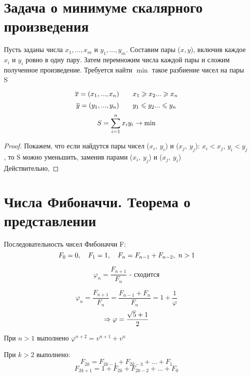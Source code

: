 \documentclass[12pt, fleqn]{article}
\begin{document}
\section{Задача о минимуме скалярного произведения}
Пусть заданы числа $x_1,...,x_m$ и $y_1,...,y_m$. Составим пары ($x,y$), включив каждое $x_i$ и $y_i$ ровно в одну пару. Затем перемножим числа каждой пары и сложим полученное произведение. Требуется найти $\min$ такое разбиение чисел на пары S
\begin{Theorem}
  \[\overline{x} = (x_1,...,x_n) \qquad x_1 \geqslant x_2 ... \geqslant x_n\]
  \[\overline{y} = (y_1,...,y_n) \qquad y_1 \leqslant y_2 ... \leqslant y_n\]
  \[S = \sum_{i=1}^n x_i y_i \rightarrow \min\]
\end{Theorem}

\begin{proof}
  Покажем, что если найдутся пары чисел ($x_i,\ y_i$) и ($x_j,\ y_j$): $x_i < x_j$, $y_i < y_j$, то S можно уменьшить, заменив парами ($x_i,\ y_j$) и ($x_j,\ y_i$)\\
  Действительно,
\end{proof}

\section{Числа Фибоначчи. Теорема о представлении}
\begin{definition}
  Последовательность чисел Фибоначчи F:
  \[F_0 = 0,\q F_1=1,\q F_n = F_{n-1} + F_{n-2},\ n>1\]
\end{definition}

\begin{Utv}
  \[\varphi_n = \dfrac{F_{n+1}}{F_n} \text{ - сходится}\]
\end{Utv}

\begin{Consequence}
  \[\varphi_n = \dfrac{F_{n+1}}{F_n} = \dfrac{F_{n-1} + F_n}{F_n} = 1 + \dfrac{1}{\varphi}\]
  \[\Rightarrow \varphi = \dfrac{\sqrt{5}+1}{2}\]
\end{Consequence}

\begin{lemma}
  При $n > 1$ выполнено $\varphi^{n+2} = v^{n+1} + v^n$
\end{lemma}

\begin{Proof}

\end{Proof}

\begin{lemma}
  При $k > 2$ выполнено:
  \[F_{2k} = F_{2k-1} + F_{2k-3} + ... + F_1\]
  \[F_{2k+1} = 1 + F_{2k} + F_{2k-2} + ... + F_0\]
\end{lemma}
\end{document}
